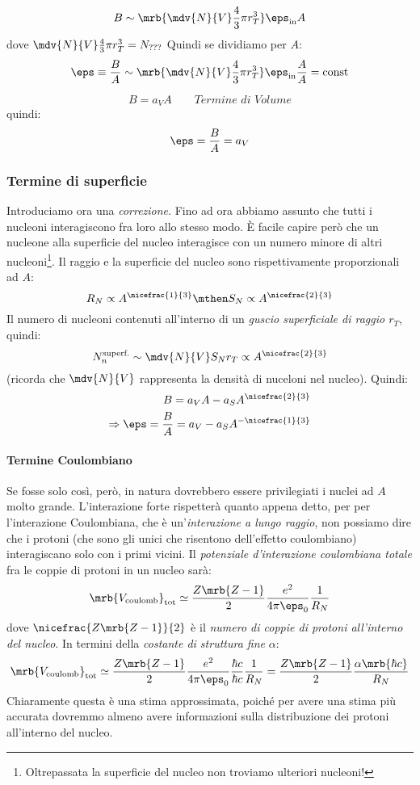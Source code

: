 \[
  B \sim \mrb{\mdv{N}{V} \frac{4}{3} \pi r_T^3} \eps_\text{in} A
\]
dove $\mdv{N}{V} \frac{4}{3} \pi r_T^3 = N_\text{???}$
Quindi se dividiamo per $A$:
\[
  \eps \equiv \frac{B}{A} \sim \mrb{\mdv{N}{V} \frac{4}{3} \pi r_T^3}
  \eps_\text{in} \frac{A}{A} = \text{const}
\]


\[
  B = a_V A \qquad \textit{Termine di Volume}
\]
quindi:
\[
  \eps = \frac{B}{A} = a_V
\]

\subsubsection{Termine di superficie}
Introduciamo ora una \textit{correzione}. Fino ad ora abbiamo assunto che tutti
i nucleoni interagiscono fra loro allo stesso modo. È facile capire però che un
nucleone alla superficie del nucleo interagisce con un numero minore di altri
nucleoni\footnote{
  Oltrepassata la superficie del nucleo non troviamo ulteriori nucleoni!
}.
Il raggio e la superficie del nucleo sono rispettivamente proporzionali ad $A$:
\[
  R_N \propto A ^{\nicefrac{1}{3}}
  \mthen
  S_N \propto A ^{\nicefrac{2}{3}}
\]
Il numero di nucleoni contenuti all'interno di un \textit{guscio superficiale
di raggio $r_T$}, quindi:
\[
  N_n ^\text{superf.} \sim \mdv{N}{V} S_N r_T \propto A ^{\nicefrac{2}{3}}
\]
(ricorda che $\mdv{N}{V}$ rappresenta la densità di nuceloni nel nucleo).
Quindi:
\begin{align*}
  B = a_V A - a_S A ^{\nicefrac{2}{3}}
  \\
  \Rightarrow \eps = \frac{B}{A} = a_V - a_S A ^{-\nicefrac{1}{3}}
\end{align*}

\paragraph{Termine Coulombiano}
Se fosse solo così, però, in natura dovrebbero essere privilegiati i nuclei ad
$A$ molto grande. L'interazione forte rispetterà quanto appena detto, per per
l'interazione Coulombiana, che è un'\textit{interazione a lungo raggio}, non
possiamo dire che i protoni (che sono gli unici che risentono dell'effetto
coulombiano) interagiscano solo con i primi vicini. Il \textit{potenziale
d'interazione coulombiana totale} fra le coppie di protoni in un nucleo sarà:
\[
  \mrb{V _\text{coulomb}}_\text{tot} \simeq \frac{Z \mrb{Z - 1}}{2} \frac{e^2}{4
  \pi \eps_0} \frac{1}{R_N}
\]
dove $\nicefrac{Z \mrb{Z - 1}}{2}$ è il \textit{numero di coppie di protoni
all'interno del nucleo}. In termini della \textit{costante di struttura fine}
$\alpha$:
\[
  \mrb{V _\text{coulomb}}_\text{tot} \simeq \frac{Z \mrb{Z - 1}}{2}
  \frac{e^2}{4 \pi \eps_0} \frac{\hbar c}{\hbar c} \frac{1}{R_N} = \frac{Z
  \mrb{Z - 1}}{2} \frac{\alpha \mrb{\hbar c}}{R_N}
\]
Chiaramente questa è una stima approssimata, poiché per avere una stima più
accurata dovremmo almeno avere informazioni sulla distribuzione dei protoni
all'interno del nucleo.

